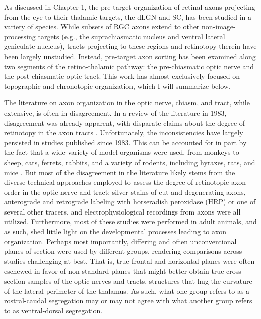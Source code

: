 \label{sec:RetinogeniculateOrganization}
As discussed in Chapter 1, the pre-target organization of retinal axons projecting from the eye to their thalamic targets, the dLGN and SC, has been studied in a variety of species.
While subsets of RGC axons extend to other non-image-processing targets (e.g., the suprachiasmatic nucleus and ventral lateral geniculate nucleus), tracts projecting to these regions and retinotopy therein have been largely unstudied.
Instead, pre-target axon sorting has been examined along two segments of the retino-thalamic pathway: the pre-chiasmatic optic nerve and the post-chiasmatic optic tract.
This work has almost exclusively focused on topographic and chronotopic organization, which I will summarize below.

The literature on axon organization in the optic nerve, chiasm, and tract, while extensive, is often in disagreement.
In a review of the literature in 1983, disagreement was already apparent, with disparate claims about the degree of retinotopy in the axon tracts \cite{martin1983role}.
Unfortunately, the inconsistencies have largely persisted in studies published since 1983.
This can be accounted for in part by the fact that a wide variety of model organisms were used, from monkeys to sheep, cats, ferrets, rabbits, and a variety of rodents, including hyraxes, rats, and mice \cite{martin1983role}. 
But most of the disagreement in the literature likely stems from the diverse technical approaches employed to assess the degree of retinotopic axon order in the optic nerve and tract: silver stains of cut and degenerating axons, anterograde and retrograde labeling with horseradish peroxidase (HRP) or one of several other tracers, and electrophysiological recordings from axons were all utilized.
Furthermore, most of these studies were performed in adult animals, and as such, shed little light on the developmental processes leading to axon organization.
Perhaps most importantly, differing and often unconventional planes of section were used by different groups, rendering comparisons across studies challenging at best.
That is, true frontal and horizontal planes were often eschewed in favor of non-standard planes that might better obtain true cross-section samples of the optic nerves and tracts, structures that hug the curvature of the lateral perimeter of the thalamus.
As such, what one group refers to as a rostral-caudal segregation may or may not agree with what another group refers to as ventral-dorsal segregation. %

